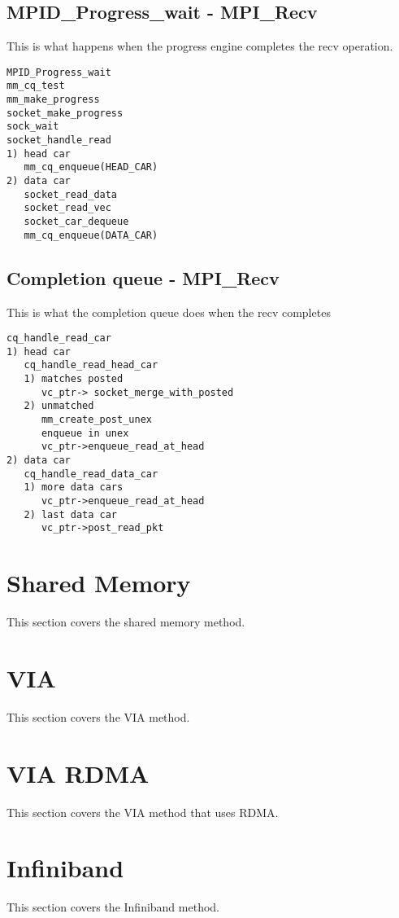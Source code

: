 \documentclass[dvipdfm,twoside,11pt]{article}
\begin{document}
\subsection{MPID\_Progress\_wait - MPI\_Recv}
This is what happens when the progress engine completes the recv operation.
\begin{verbatim}
MPID_Progress_wait
mm_cq_test
mm_make_progress
socket_make_progress
sock_wait
socket_handle_read
1) head car
   mm_cq_enqueue(HEAD_CAR)
2) data car
   socket_read_data
   socket_read_vec
   socket_car_dequeue
   mm_cq_enqueue(DATA_CAR)
\end{verbatim}

\subsection{Completion queue - MPI\_Recv}
This is what the completion queue does when the recv completes
\begin{verbatim}
cq_handle_read_car
1) head car
   cq_handle_read_head_car
   1) matches posted
      vc_ptr-> socket_merge_with_posted
   2) unmatched
      mm_create_post_unex
      enqueue in unex
      vc_ptr->enqueue_read_at_head
2) data car
   cq_handle_read_data_car
   1) more data cars
      vc_ptr->enqueue_read_at_head
   2) last data car
      vc_ptr->post_read_pkt
\end{verbatim}

\section{Shared Memory}
This section covers the shared memory method.

\section{VIA}
This section covers the VIA method.

\section{VIA RDMA}
This section covers the VIA method that uses RDMA.

\section{Infiniband}
This section covers the Infiniband method.
\end{document}
